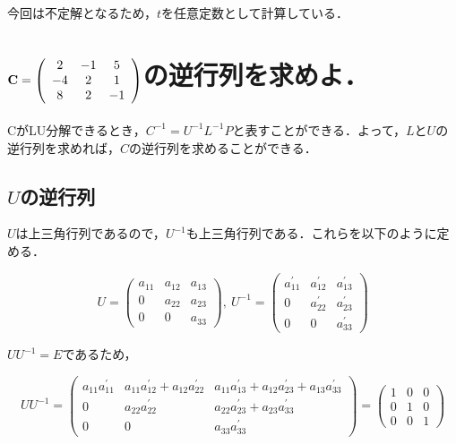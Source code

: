 \documentclass[dvipdfmx,titlepage]{jsarticle}
\def\MARU#1{{\rm\ooalign{\hfil\lower.168ex\hbox{#1}\hfil \crcr\mathhexbox20D}}}
\begin{document}
今回は不定解となるため，$t$を任意定数として計算している．

\section*{\MARU{2}
$
\rm{\bf{C}} = \left(
    \protect\begin{array}{ccc}
      2 & -1 & 5 \\
      -4 & 2 & 1 \\
      8 & 2 & -1
    \protect\end{array}
  \right)$の逆行列を求めよ．
}

CがLU分解できるとき，$C^{-1}=U^{-1}L^{-1}P$と表すことができる．よって，$L$と$U$の逆行列を求めれば，$C$の逆行列を求めることができる．

\subsection*{$U$の逆行列}
$U$は上三角行列であるので，$U^{-1}$も上三角行列である．これらを以下のように定める．

\begin{equation*}
	U = \left(
	\begin{array}{ccc}
		a_{11} & a_{12} & a_{13} \\
		0 & a_{22} & a_{23} \\
		0 & 0 & a_{33}
	\end{array}
	\right), \
	U^{-1} = \left(
	\begin{array}{ccc}
		a_{11}^{\prime} & a_{12}^{\prime} & a_{13}^{\prime} \\
		0 & a_{22}^{\prime} & a_{23}^{\prime} \\
		0 & 0 & a_{33}^{\prime}
	\end{array}
	\right)
\end{equation*}

$UU^{-1}=E$であるため，

\begin{equation*}
	UU^{-1} = \left(
	\begin{array}{ccc}
		a_{11}a_{11}^{\prime} & a_{11}a_{12}^{\prime} + a_{12}a_{22}^{\prime} & a_{11}a_{13}^{\prime} + a_{12}a_{23}^{\prime} + a_{13}a_{33}^{\prime} \\
		0 & a_{22}a_{22}^{\prime} & a_{22}a_{23}^{\prime} + a_{23}a_{33}^{\prime} \\
		0 & 0 & a_{33}a_{33}^{\prime}
	\end{array}
	\right) = \left(
	\begin{array}{ccc}
		1 & 0 & 0 \\
		0 & 1 & 0 \\
		0 & 0 & 1
	\end{array}
	\right)
\end{equation*}
\end{document}
